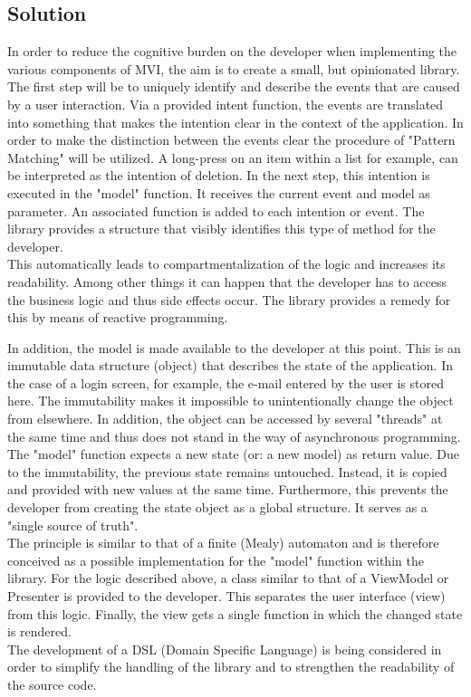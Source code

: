 \subsection{Solution}
\label{subsec:solution}

In order to reduce the cognitive burden on the developer when implementing the various components of MVI, the aim 
is to create a small, but opinionated library.\\

The first step will be to uniquely identify and describe the events that are caused by a user interaction.
Via a provided intent function, the events are translated into something that makes the intention clear in the context of the application.
In order to make the distinction between the events clear the procedure of "Pattern Matching" will be utilized. A long-press on an item within a list for example, 
can be interpreted as the intention of deletion. In the next step, this intention is executed in the "model" function. It receives the current event and model 
as parameter. An associated function is added to each intention or event. The library provides a structure that visibly identifies this type of method for the developer.\\

This automatically leads to compartmentalization of the logic and increases its readability. Among other things it can happen that the developer has to access the business 
logic and thus side effects occur. The library provides a remedy for this by means of reactive programming. 

In addition, the model is made available to the developer
at this point. This is an immutable data structure (object) that describes the state of the application. In the case of a login screen, for example, the e-mail 
entered by the user is stored here. The immutability makes it impossible to unintentionally change the object from elsewhere. In addition, the object can be accessed 
by several "threads" at the same time and thus does not stand in the way of asynchronous programming. The "model" function expects a new state (or: a new model) 
as return value. Due to the immutability, the previous state remains untouched. Instead, it is copied and provided with new values at the same time. Furthermore, 
this prevents the developer from creating the state object as a global structure. It serves as a "single source of truth".
\\
The principle is similar to that of a finite (Mealy) automaton and is therefore conceived as a possible implementation for the "model" function within the library. For the logic described above, a class similar to that of a ViewModel or Presenter 
is provided to the developer. This separates the user interface (view) from this logic. Finally, the view gets a single function in which the changed state is rendered.
\\
The development of a DSL (Domain Specific Language) is being considered in order to simplify the handling of the library and to strengthen the readability 
of the source code.



